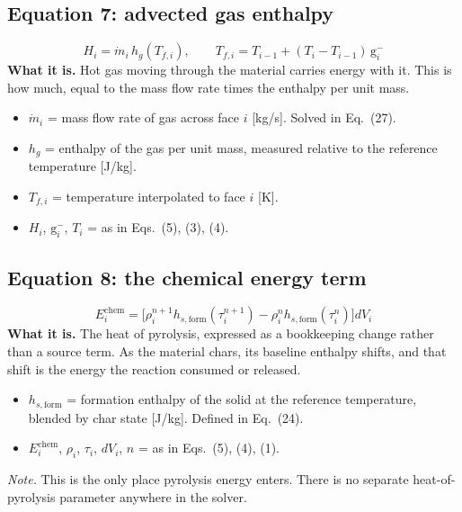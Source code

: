 \documentclass[11pt]{article}
\begin{document}
\subsection*{Equation 7: advected gas enthalpy}
\begin{equation}
H_i = \dot m_i\, h_g(T_{f,i}), \qquad
T_{f,i} = T_{i-1} + (T_i - T_{i-1})\,\mathrm{g}^-_i
\end{equation}
\textbf{What it is.} Hot gas moving through the material carries energy with it.
This is how much, equal to the mass flow rate times the enthalpy per unit mass.
\begin{itemize}
  \item $\dot m_i$ = mass flow rate of gas across face $i$ [kg/s]. Solved in
        Eq.~(27).
  \item $h_g$ = enthalpy of the gas per unit mass, measured relative to the
        reference temperature [J/kg].
  \item $T_{f,i}$ = temperature interpolated to face $i$ [K].
  \item $H_i$, $\mathrm{g}^-_i$, $T_i$ = as in Eqs.~(5), (3), (4).
\end{itemize}

\subsection*{Equation 8: the chemical energy term}
\begin{equation}
E^{\mathrm{chem}}_i = \Big[\rho_i^{n+1} h_{s,\mathrm{form}}(\tau_i^{n+1})
  - \rho_i^{n} h_{s,\mathrm{form}}(\tau_i^{n})\Big] dV_i
\end{equation}
\textbf{What it is.} The heat of pyrolysis, expressed as a bookkeeping change
rather than a source term. As the material chars, its baseline enthalpy shifts,
and that shift is the energy the reaction consumed or released.
\begin{itemize}
  \item $h_{s,\mathrm{form}}$ = formation enthalpy of the solid at the reference
        temperature, blended by char state [J/kg]. Defined in Eq.~(24).
  \item $E^{\mathrm{chem}}_i$, $\rho_i$, $\tau_i$, $dV_i$, $n$ = as in
        Eqs.~(5), (4), (1).
\end{itemize}
\textit{Note.} This is the only place pyrolysis energy enters. There is no
separate heat-of-pyrolysis parameter anywhere in the solver.
\end{document}
